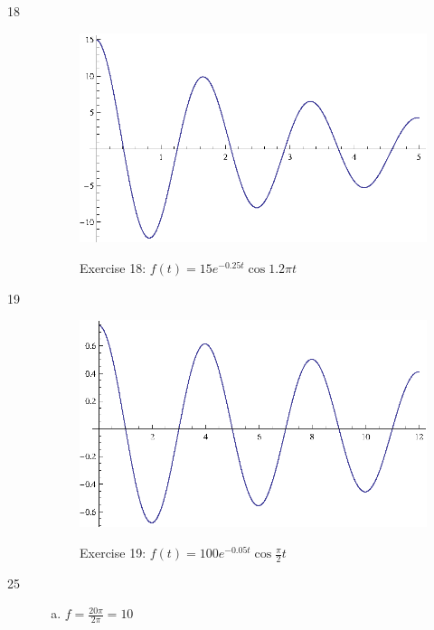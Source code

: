 \documentclass{exam}
\begin{document}
\begin{description}
      \item[18]
        \begin{figure}[H]
          \centering
          \includegraphics{exercise18.eps}

          Exercise 18: $f(t) = 15 e^{-0.25t} \cos 1.2 \pi t$
        \end{figure}

      \item[19]
        \begin{figure}[H]
          \centering
          \includegraphics{exercise19.eps}

          Exercise 19: $f(t) = 100 e^{-0.05t} \cos \frac{\pi}{2} t$
        \end{figure}

      \item[25]
        \pagebreak

        \begin{enumerate}[(a)]
          \item $f = \frac{20 \pi}{2 \pi} = \boxed{ 10 }$


\end{enumerate}
\end{description}
\end{document}
